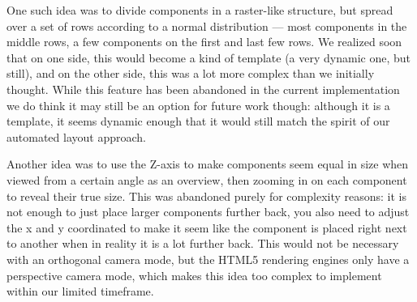     One such idea was to divide components in a raster-like structure, but
    spread over a set of rows according to a normal distribution --- most
    components in the middle rows, a few components on the first and last few
    rows. We realized soon that on one side, this would become a kind of
    template (a very dynamic one, but still), and on the other side, this was a
    lot more complex than we initially thought. While this feature has been
    abandoned in the current implementation we do think it may still be an
    option for future work though: although it is a template, it seems dynamic
    enough that it would still match the spirit of our automated layout
    approach.

    Another idea was to use the Z-axis to make components seem equal in size
    when viewed from a certain angle as an overview, then zooming in on each
    component to reveal their true size. This was abandoned purely for
    complexity reasons: it is not enough to just place larger components
    further back, you also need to adjust the x and y coordinated to make it
    seem like the component is placed right next to another when in reality it
    is a lot further back. This would not be necessary with an orthogonal
    camera mode, but the HTML5 rendering engines only have a perspective camera
    mode, which makes this idea too complex to implement within our limited
    timeframe.

